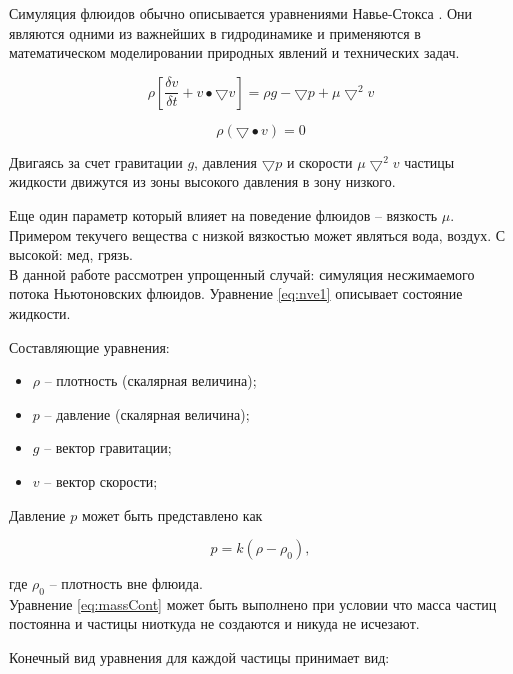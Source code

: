 Симуляция флюидов обычно описывается уравнениями Навье-Стокса \cite{sphHarada}.
Они являются одними из важнейших в гидродинамике и применяются в математическом
моделировании природных явлений и технических задач.

\begin{equation}
\label{eq:nve1}
  \rho[\frac{\delta{}v}{\delta{}t} + v \bullet \bigtriangledown{}v] = \rho{}g - \bigtriangledown{}p + \mu{}\bigtriangledown^2v
\end{equation}

\begin{equation}
\label{eq:massCont}
  \rho(\bigtriangledown\bullet{}v) = 0
\end{equation}

Двигаясь за счет гравитации $g$, давления $\bigtriangledown{}p$ и скорости $\mu\bigtriangledown^2v$ частицы жидкости движутся из зоны высокого давления в зону низкого.

Еще один параметр который влияет на поведение флюидов -- вязкость $\mu$.
Примером текучего вещества с низкой вязкостью может являться вода, воздух.
С высокой: мед, грязь. \\

В данной работе рассмотрен упрощенный случай: симуляция несжимаемого потока
Ньютоновских флюидов. Уравнение \eqref{eq:nve1} описывает состояние жидкости.

Составляющие уравнения:

\begin{itemize}
  \item $\rho$ -- плотность (скалярная величина);
  \item $p$ -- давление (скалярная величина);
  \item $g$ -- вектор гравитации;
  \item $v$ -- вектор скорости;
\end{itemize}

Давление $p$ может быть представлено как

\begin{equation}
\label{eq:pressure}
  p = k(\rho - \rho_0),
\end{equation}

где $\rho_0$ -- плотность вне флюида. \\

Уравнение \eqref{eq:massCont} может быть выполнено при условии что масса частиц
постоянна и частицы ниоткуда не создаются и никуда не исчезают.

Конечный вид уравнения для каждой частицы принимает вид:

